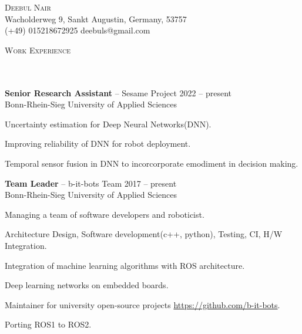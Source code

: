 \documentclass{article}
\newcommand{\contact}[3]{
\vspace*{5pt}
\begin{center}
{\Huge \scshape {#1}}\\
\vspace{3pt}
#2 
\vspace{2pt}
#3
\end{center}
\vspace*{-8pt}
}
\newcommand{\header}[1]{{
\hspace*{-15pt}\vspace*{6pt} \textsc{#1}} \vspace*{-6pt} 
\lineunder
}
\newcommand{\lineunder}{
\vspace*{-8pt} \\ \hspace*{-18pt} 
\hrulefill \\
}
\newcommand{\content}{
\vspace*{2pt}%
}
\newcommand{\employer}[4]{{
\vspace*{2pt}%
\textbf{#1} #2 \hfill #3\\ #4 \vspace*{2pt}}
}
\renewcommand{\labelitemi}{
	\raisebox{0.3ex}{\tiny\textbullet}
}
\renewcommand{\labelitemii}{
	\raisebox{0.3ex}{\tiny\textbullet}
}
\newenvironment{bullet-list-minor}{
\begin{list}{\labelitemii}{\setlength\leftmargin{15pt} 
\topsep 0pt \itemsep -2pt}}{\vspace*{4pt}\end{list}
}
\begin{document}
\small
\smallskip
\vspace*{-44pt}

\contact{Deebul Nair}
{Wacholderweg 9, Sankt Augustin, Germany, 53757\\}
{(+49) 015218672925 \labelitemi deebuls@gmail.com}
\vspace{15pt}

\vspace*{4pt}%


\vspace*{4pt}%
\header{Work Experience}
    \employer{Senior Research Assistant}{-- Sesame Project}{2022 -- present}
    {Bonn-Rhein-Sieg University of Applied Sciences}
	\begin{bullet-list-minor}
	\item Uncertainty estimation for Deep Neural Networks(DNN).
    \item Improving reliability of DNN for robot deployment.
    \item  Temporal sensor fusion in DNN to incorcorporate emodiment in decision making.
    \end{bullet-list-minor}
    
    \employer{Team Leader}{-- b-it-bots Team}{2017 -- present}
    {Bonn-Rhein-Sieg University of Applied Sciences}
	\begin{bullet-list-minor}
	\item Managing a team of software developers and roboticist.
	\item Architecture Design, Software development(c++, python), Testing, CI, H/W Integration.
	\item Integration of machine learning algorithms with ROS architecture.
    \item Deep learning networks on embedded boards.
    \item Maintainer for university open-source projects \url{https://github.com/b-it-bots}.
	\item Porting ROS1 to ROS2.
    \end{bullet-list-minor}
    
\end{document}

